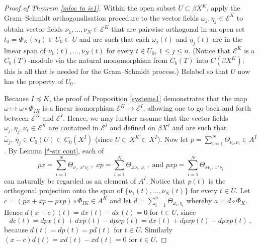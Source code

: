 \documentclass{amsart}
\theoremstyle{definition}
\theoremstyle{remark}
\begin{document}
\begin{proof}[Proof of Theorem \ref{mloc to ie1}]
Within the open subset $U\subset\beta X^K$, apply the Gram--Schmidt orthogonalisation procedure \cite[Lemma 4.2]{fell1961}
to the vector fields $\omega_j,\eta_j\in \mathcal E^K$ to obtain vector fields $\nu_1,\dots,\nu_N\in\mathcal E^K$
that are pairwise orthogonal in an open set $t_0=\Phi_K(s_0)\in U_0\subset U$ and are such that each $\omega_j(t)$ and $\eta_j(t)$
are in the linear span of $\nu_1(t),\dots,\nu_N(t)$ for every $t\in U_0$, $1\leq j\leq n$. (Notice that $\mathcal E^K$ is a $C_b(T)$-module via the natural monomorphism from $C_b(T)$ into $C(\beta X^K)$; this is all that is needed for the Gram--Schmidt process.)
Relabel so that $U$ now has the property of $U_0$.

Because $I \preccurlyeq K$, the proof of
Proposition \ref{systems1} demonstrates that the map $\omega\mapsto\omega\circ\Phi_{IK}$
is a linear isomorphism  $\mathcal E^K\rightarrow\mathcal E^I$, allowing one to go back and forth between $\mathcal E^K$ and $\mathcal E^I$. Hence, we may further assume that the vector fields
$\omega_j,\eta_j, \nu_\ell\in \mathcal E^K$ are contained in $\mathcal E^I$ and defined on $\beta X^I$ and are such that $\check{\omega_j},\,\check{\eta_j}\in C_0(U)\subset C_0(X^I)$ (since $U\subset X^K\subset X^I$). Now let $p=\sum_{i=1}^N\Theta_{\nu_i,\nu_i}\in A^I$. By Lemma \ref{*-str cont}, each of
\[
px=\sum_{i=1}^N \Theta_{\nu_i,\,x^*\nu_i}\ , \; xp=\sum_{i=1}^N \Theta_{x\nu_i,\, \nu_i}\ , \; \mbox{and } pxp=\sum_{i=1}^N \Theta_{x\nu_i,\,x^*\nu_i}
\]
can naturally be regarded as an element of $A^I$.
Notice that $p(t)$ is the orthogonal projection onto the span of $\{\nu_1(t),\ldots,\nu_N(t)\}$ for every $t\in U$. Let $c=(px+xp-pxp)\circ \Phi_{IK}\in A^K$ and let
$d=\sum_{i=1}^n \Theta_{\omega_i,\eta_i}$ whereby $a=d\circ \Phi_K$.
Hence $d(x-c )(t)=dx(t)-dx(t)=0$ for $t\in U$, since
\[
dc(t)=dpx(t)+dxp(t)-dpxp(t)=dx(t)+dpxp(t)-dpxp(t) \,,
\]
because $d(t)=dp(t)=pd(t)$ for $t\in U$. Similarly $(x-c)d(t)=xd(t)-xd(t)=0$ for $t\in U$.


\end{proof}
\end{document}
